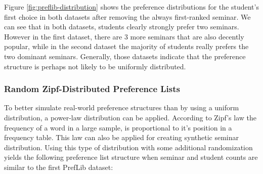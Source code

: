 Figure \ref{fig:preflib-distribution} shows the preference distributions for the student's first choice in both datasets after removing the always first-ranked seminar. We can see that in both datasets, students clearly strongly prefer two seminars. However in the first dataset, there are 3 more seminars that are also decently popular, while in the second dataset the majority of students really prefers the two dominant seminars. Generally, those datasets indicate that the preference structure is perhaps not likely to be uniformly distributed.

\subsubsection{Random Zipf-Distributed Preference Lists}
To better simulate real-world preference structures than by using a uniform distribution, a power-law distribution can be applied. According to Zipf's law the frequency of a word in a large sample, is proportional to it's position in a frequency table. This law can also be applied for creating synthetic seminar distribution. Using this type of distribution with some additional randomization yields the following preference list structure when seminar and student counts are similar to the first PrefLib dataset:

